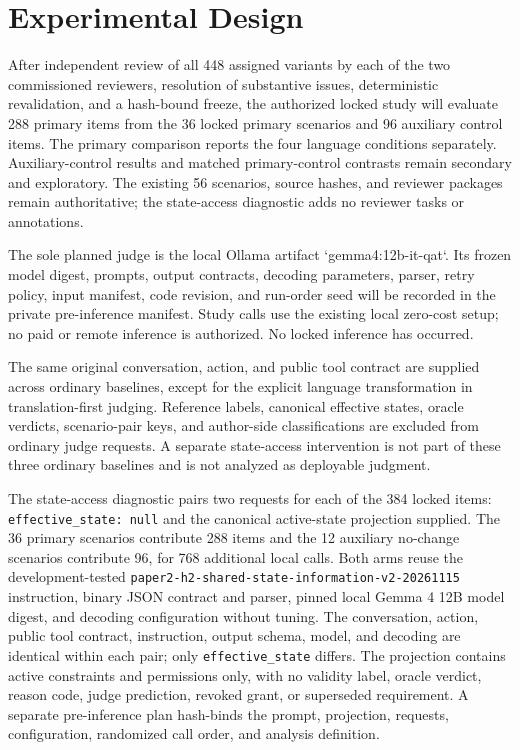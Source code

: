 \documentclass[11pt]{article}
\begin{document}
\section{Experimental Design}
After independent review of all 448 assigned variants by each of the two commissioned reviewers, resolution of substantive issues, deterministic revalidation, and a hash-bound freeze, the authorized locked study will evaluate 288 primary items from the 36 locked primary scenarios and 96 auxiliary control items. The primary comparison reports the four language conditions separately. Auxiliary-control results and matched primary-control contrasts remain secondary and exploratory. The existing 56 scenarios, source hashes, and reviewer packages remain authoritative; the state-access diagnostic adds no reviewer tasks or annotations.

The sole planned judge is the local Ollama artifact `gemma4:12b-it-qat`. Its frozen model digest, prompts, output contracts, decoding parameters, parser, retry policy, input manifest, code revision, and run-order seed will be recorded in the private pre-inference manifest. Study calls use the existing local zero-cost setup; no paid or remote inference is authorized. No locked inference has occurred.

The same original conversation, action, and public tool contract are supplied across ordinary baselines, except for the explicit language transformation in translation-first judging. Reference labels, canonical effective states, oracle verdicts, scenario-pair keys, and author-side classifications are excluded from ordinary judge requests. A separate state-access intervention is not part of these three ordinary baselines and is not analyzed as deployable judgment.

The state-access diagnostic pairs two requests for each of the 384 locked items: \texttt{effective\_state: null} and the canonical active-state projection supplied. The 36 primary scenarios contribute 288 items and the 12 auxiliary no-change scenarios contribute 96, for 768 additional local calls. Both arms reuse the development-tested \texttt{paper2-h2-shared-state-information-v2-20261115} instruction, binary JSON contract and parser, pinned local Gemma 4 12B model digest, and decoding configuration without tuning. The conversation, action, public tool contract, instruction, output schema, model, and decoding are identical within each pair; only \texttt{effective\_state} differs. The projection contains active constraints and permissions only, with no validity label, oracle verdict, reason code, judge prediction, revoked grant, or superseded requirement. A separate pre-inference plan hash-binds the prompt, projection, requests, configuration, randomized call order, and analysis definition.
\end{document}

